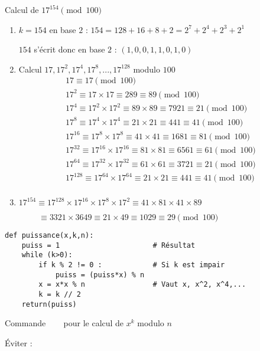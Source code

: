 \begin{frame}

Calcul de $17^{154} \pmod {100}$


\begin{enumerate}

\pause  
  \item $k=154$ en base $2$ : $154 = 128 + 16 + 8 + 2 = 2^7 + 2^4 + 2^3 + 2^1$

\pause
  $154$ s'écrit donc en base $2$ : $(1,0,0,1,1,0,1,0)$
  
\pause  

  \item Calcul $17, 17^2, 17^4, 17^8,...,17^{128}$ modulo $100$
  \vspace*{-2ex}
  \pause
$$
\begin{array}{l}
17  \equiv  17 \pmod{100} \\
17^2  \equiv  17 \times 17 \equiv 289 \equiv 89 \pmod{100} \\
17^4  \equiv 17^2 \times 17^2 \equiv 89 \times 89 \equiv 7921 \equiv 21 \pmod{100} \\
17^8  \equiv 17^4 \times 17^4 \equiv 21 \times 21 \equiv 441 \equiv 41 \pmod{100} \\
17^{16}  \equiv 17^8 \times 17^8 \equiv 41 \times 41 \equiv 1681 \equiv 81 \pmod{100} \\
17^{32}  \equiv 17^{16} \times 17^{16} \equiv 81 \times 81 \equiv 6561 \equiv 61 \pmod{100} \\
17^{64}  \equiv 17^{32} \times 17^{32} \equiv 61 \times 61 \equiv 3721 \equiv 21 \pmod{100} \\
17^{128}  \equiv 17^{64} \times 17^{64} \equiv 21 \times 21 \equiv 441 \equiv 41 \pmod{100} \\
\end{array}
$$

\pause 

  \item $17^{154} \equiv 17^{128} \times 17^{16} \times 17^{8} \times 17^{2}
\equiv 41 \times 81 \times 41 \times 89 
$

$ \quad \quad \ \, \equiv 3321 \times 3649 \equiv 21 \times 49\equiv 1029 \equiv 29 \pmod {100}$
\end{enumerate}
\end{frame}


\begin{frame}[fragile]

\begin{algo}[euclide.py (3)]
\begin{lstlisting}
def puissance(x,k,n):
    puiss = 1                      # Résultat
    while (k>0):
        if k % 2 != 0 :            # Si k est impair
            puiss = (puiss*x) % n  
        x = x*x % n                # Vaut x, x^2, x^4,...
        k = k // 2 
    return(puiss)  
\end{lstlisting}
\end{algo}

\pause
\bigskip

Commande \Python\ \  \ pour le calcul de $x^k$ modulo $n$

\pause

\'Eviter : 
\end{frame}


